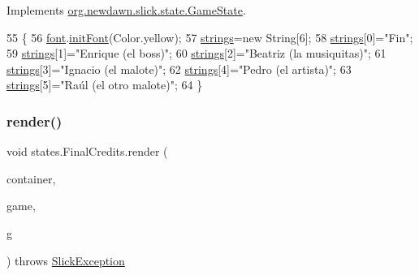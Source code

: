Implements \mbox{\hyperlink{interfaceorg_1_1newdawn_1_1slick_1_1state_1_1_game_state_aa799a369e0fcfe6822d2d586fa6f5bbc}{org.\+newdawn.\+slick.\+state.\+Game\+State}}.


\begin{DoxyCode}
55                                                                                                      \{
56         \mbox{\hyperlink{classstates_1_1_final_credits_a03543cc856cb4e1b2fb064dc86913fbc}{font}}.\mbox{\hyperlink{classgui_1_1_g_u_i_font_ae1fccb6783e7c0f11fdcedd36362585d}{initFont}}(Color.yellow);
57         \mbox{\hyperlink{classstates_1_1_final_credits_aa72712a2592f1b5e7025dc65bf28c43d}{strings}}=\textcolor{keyword}{new} String[6];
58         \mbox{\hyperlink{classstates_1_1_final_credits_aa72712a2592f1b5e7025dc65bf28c43d}{strings}}[0]=\textcolor{stringliteral}{"Fin"};
59         \mbox{\hyperlink{classstates_1_1_final_credits_aa72712a2592f1b5e7025dc65bf28c43d}{strings}}[1]=\textcolor{stringliteral}{"Enrique (el boss)"};
60         \mbox{\hyperlink{classstates_1_1_final_credits_aa72712a2592f1b5e7025dc65bf28c43d}{strings}}[2]=\textcolor{stringliteral}{"Beatriz (la musiquitas)"};
61         \mbox{\hyperlink{classstates_1_1_final_credits_aa72712a2592f1b5e7025dc65bf28c43d}{strings}}[3]=\textcolor{stringliteral}{"Ignacio (el malote)"};
62         \mbox{\hyperlink{classstates_1_1_final_credits_aa72712a2592f1b5e7025dc65bf28c43d}{strings}}[4]=\textcolor{stringliteral}{"Pedro (el artista)"};
63         \mbox{\hyperlink{classstates_1_1_final_credits_aa72712a2592f1b5e7025dc65bf28c43d}{strings}}[5]=\textcolor{stringliteral}{"Raúl (el otro malote)"};
64     \}
\end{DoxyCode}
\mbox{\label{classstates_1_1_final_credits_a48f6a5fefe171870bf0d8419f15b791d}} 
\subsubsection{\texorpdfstring{render()}{render()}}
{\footnotesize\ttfamily void states.\+Final\+Credits.\+render (\begin{DoxyParamCaption}\item[{\mbox{\hyperlink{classorg_1_1newdawn_1_1slick_1_1_game_container}{Game\+Container}}}]{container,  }\item[{\mbox{\hyperlink{classorg_1_1newdawn_1_1slick_1_1state_1_1_state_based_game}{State\+Based\+Game}}}]{game,  }\item[{\mbox{\hyperlink{classorg_1_1newdawn_1_1slick_1_1_graphics}{Graphics}}}]{g }\end{DoxyParamCaption}) throws \mbox{\hyperlink{classorg_1_1newdawn_1_1slick_1_1_slick_exception}{Slick\+Exception}}\hspace{0.3cm}{\ttfamily [inline]}}

